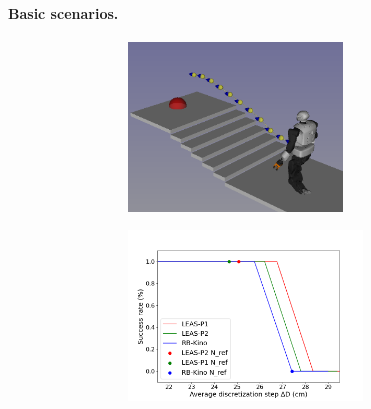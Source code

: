 
\paragraph{Basic scenarios.\label{subsub:mip:basic_scenarios}}
\begin{figure}[h!]
    \centering
    \captionsetup[subfigure]{justification=centering}
    \begin{subfigure}{0.9\linewidth}
        \centering
        \begin{subfigure}{0.48\linewidth}
            \includegraphics[trim={0cm 0cm 0cm 0cm},clip,width=\textwidth,height=4.5cm]{Figures/Chapter_MIP_SL1M/res_mip/scenario_stairs.png}
        \end{subfigure}
        \begin{subfigure}{0.48\linewidth}
            \includegraphics[trim={0cm 0cm 2cm 1.8cm}, clip,width=\textwidth,height=4.5cm]{Figures/Chapter_MIP_SL1M/res_mip/MIP_stairs/FIGURE_MIP_STAIRS_2.png}

\end{subfigure}
\end{subfigure}
\end{figure}
